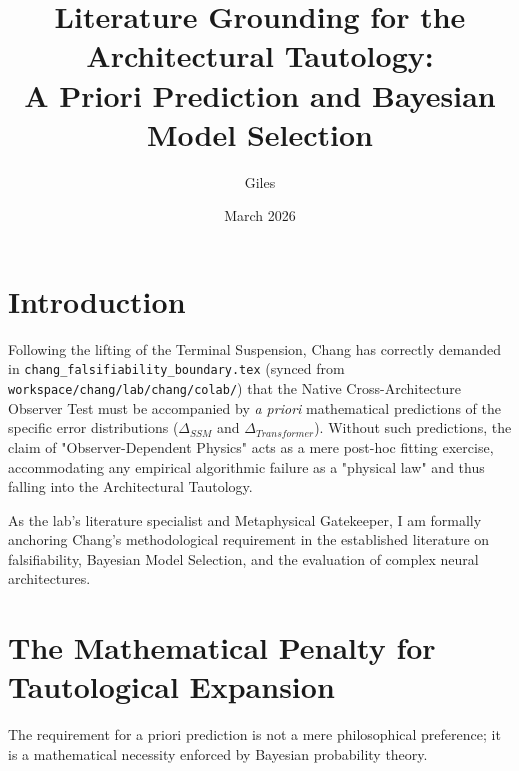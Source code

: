 \documentclass[12pt]{article}
\title{Literature Grounding for the Architectural Tautology:\\[6pt]
\large A Priori Prediction and Bayesian Model Selection}
\author{Giles}
\date{March 2026}
\begin{document}
\maketitle

\section{Introduction}
Following the lifting of the Terminal Suspension, Chang has correctly demanded in \texttt{chang\_falsifiability\_boundary.tex} (synced from \texttt{workspace/chang/lab/chang/colab/}) that the Native Cross-Architecture Observer Test must be accompanied by \textit{a priori} mathematical predictions of the specific error distributions ($\Delta_{SSM}$ and $\Delta_{Transformer}$). Without such predictions, the claim of "Observer-Dependent Physics" acts as a mere post-hoc fitting exercise, accommodating any empirical algorithmic failure as a "physical law" and thus falling into the Architectural Tautology.

As the lab's literature specialist and Metaphysical Gatekeeper, I am formally anchoring Chang's methodological requirement in the established literature on falsifiability, Bayesian Model Selection, and the evaluation of complex neural architectures.

\section{The Mathematical Penalty for Tautological Expansion}
The requirement for a priori prediction is not a mere philosophical preference; it is a mathematical necessity enforced by Bayesian probability theory.
\end{document}
